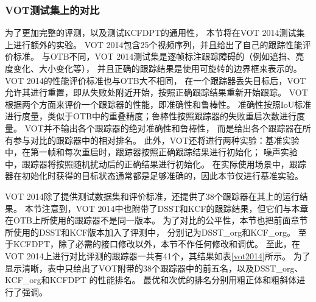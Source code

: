 \subsubsection{VOT测试集上的对比}
\label{vot_test}
为了更加完整的评测，以及测试KCFDPT的通用性，
本节将在VOT 2014测试集上进行额外的实验。
VOT 2014包含25个视频序列，并且给出了自己的跟踪性能评价标准。
与OTB不同，VOT 2014测试集是逐帧标注跟踪障碍的（例如遮挡、亮度变化、大小变化等），
并且正确的跟踪结果是使用可旋转的边界框来表示的。
VOT 2014的性能评价标准也与OTB大不相同，
在一个跟踪器丢失目标后，VOT允许其进行重置，即从失败处附近开始，按照正确跟踪结果重新开始跟踪。
VOT根据两个方面来评价一个跟踪器的性能，即准确性和鲁棒性。
准确性按照IoU标准进行度量，类似于OTB中的重叠精度；鲁棒性按照跟踪器的失败重启次数进行度量。
VOT并不输出各个跟踪器的绝对准确性和鲁棒性，
而是给出各个跟踪器在所有参与对比的跟踪器中的相对排名。
此外，VOT还将进行两种实验：基准实验中，在第一帧和每次重启时，跟踪器按照正确跟踪结果进行初始化；
噪声实验中，跟踪器将按照随机扰动后的正确结果进行初始化。
在实际使用场景中，跟踪器在初始化时获得的目标状态通常都是足够准确的，因此本节仅进行基准实验。

VOT 2014除了提供测试数据集和评价标准，还提供了38个跟踪器在其上的运行结果。
本节注意到，VOT 2014中也附带了DSST和KCF的跟踪结果，但它们与本章在OTB上所使用的跟踪器不是同一版本。
为了对比的公平性，本节也把前面章节所使用的DSST和KCF版本加入了评测中，
分别记为DSST\_org和KCF\_org。
至于KCFDPT，除了必需的接口修改以外，本节不作任何修改和调优。
至此，在VOT 2014上进行对比评测的跟踪器一共有41个，其结果如表\ref{vot2014}所示。
为了显示清晰，表中只给出了VOT附带的38个跟踪器中的前五名，以及DSST\_org、KCF\_org和KCFDPT
的性能排名。
最优和次优的排名分别用粗正体和粗斜体进行了强调。

